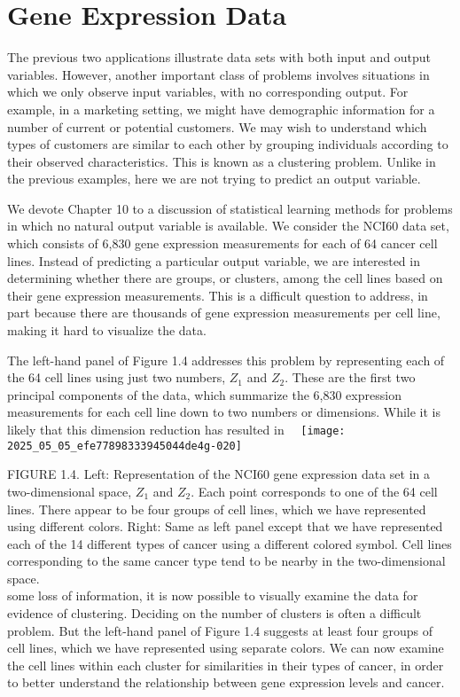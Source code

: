 \documentclass[10pt]{article}
\begin{document}
\section*{Gene Expression Data}
The previous two applications illustrate data sets with both input and output variables. However, another important class of problems involves situations in which we only observe input variables, with no corresponding output. For example, in a marketing setting, we might have demographic information for a number of current or potential customers. We may wish to understand which types of customers are similar to each other by grouping individuals according to their observed characteristics. This is known as a clustering problem. Unlike in the previous examples, here we are not trying to predict an output variable.

We devote Chapter 10 to a discussion of statistical learning methods for problems in which no natural output variable is available. We consider the NCI60 data set, which consists of 6,830 gene expression measurements for each of 64 cancer cell lines. Instead of predicting a particular output variable, we are interested in determining whether there are groups, or clusters, among the cell lines based on their gene expression measurements. This is a difficult question to address, in part because there are thousands of gene expression measurements per cell line, making it hard to visualize the data.

The left-hand panel of Figure 1.4 addresses this problem by representing each of the 64 cell lines using just two numbers, $Z_{1}$ and $Z_{2}$. These are the first two principal components of the data, which summarize the 6,830 expression measurements for each cell line down to two numbers or dimensions. While it is likely that this dimension reduction has resulted in\
\
\texttt{[image: 2025\_05\_05\_efe77898333945044de4g-020]}

FIGURE 1.4. Left: Representation of the NCI60 gene expression data set in a two-dimensional space, $Z_{1}$ and $Z_{2}$. Each point corresponds to one of the 64 cell lines. There appear to be four groups of cell lines, which we have represented using different colors. Right: Same as left panel except that we have represented each of the 14 different types of cancer using a different colored symbol. Cell lines corresponding to the same cancer type tend to be nearby in the two-dimensional space.\\
some loss of information, it is now possible to visually examine the data for evidence of clustering. Deciding on the number of clusters is often a difficult problem. But the left-hand panel of Figure 1.4 suggests at least four groups of cell lines, which we have represented using separate colors. We can now examine the cell lines within each cluster for similarities in their types of cancer, in order to better understand the relationship between gene expression levels and cancer.
\end{document}
